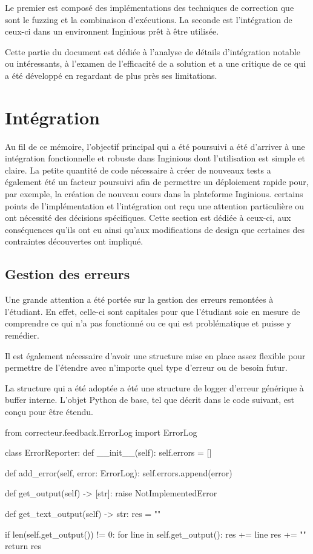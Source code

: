 \documentclass[a4paper]{report}
\begin{document}
Le premier est composé des implémentations des techniques de correction que sont le fuzzing et la combinaison d'exécutions.
La seconde est l'intégration de ceux-ci dans un environnent Inginious prêt à être utilisée.

Cette partie du document est dédiée à l'analyse de détails d'intégration notable ou intéressants, à l'examen de l'efficacité de a solution et a une critique de ce qui a été développé en regardant de plus près ses limitations.



\section{Intégration}
Au fil de ce mémoire, l'objectif principal qui a été poursuivi a été d'arriver à une intégration fonctionnelle et robuste dans Inginious dont l'utilisation est simple et claire.
La petite quantité de code nécessaire à créer  de nouveaux tests a également été un facteur poursuivi afin de permettre un déploiement rapide pour, par exemple, la création de nouveau cours dans la plateforme Inginious.
certains points de l'implémentation et l'intégration ont reçu une attention particulière ou ont nécessité des décisions spécifiques.
Cette section est dédiée à ceux-ci, aux conséquences qu'ils ont eu ainsi qu'aux modifications de design que certaines des contraintes découvertes ont impliqué.

\subsection{Gestion des erreurs}
Une grande attention a été portée sur la gestion des erreurs remontées à l'étudiant.
En effet, celle-ci sont capitales pour que l'étudiant soie en mesure de comprendre ce qui n'a pas fonctionné ou ce qui est problématique et puisse y remédier.

Il est également nécessaire d'avoir une structure mise en place assez flexible pour permettre de l'étendre avec n'importe quel type d'erreur ou de besoin futur.

La structure qui a été adoptée a été une structure de logger d'erreur générique à buffer interne.
L'objet Python de base, tel que décrit dans le code suivant, est conçu pour être étendu.


\begin{python}
from correcteur.feedback.ErrorLog import ErrorLog

class ErrorReporter:
    def __init__(self):
        self.errors = []

    def add_error(self, error: ErrorLog):
        self.errors.append(error)

    def get_output(self) -> [str]:
        raise NotImplementedError

    def get_text_output(self) -> str:
        res = ""

        if len(self.get_output()) != 0:
            for line in self.get_output():
                res += line
                res += "\n"
        return res
\end{python}
\end{document}
